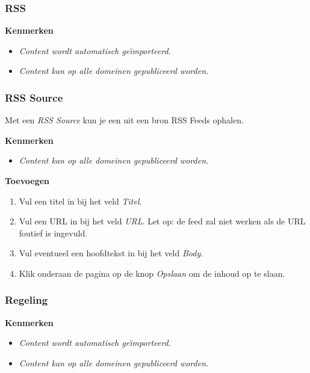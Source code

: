 \subsubsection{RSS}\label{rss}

\textbf{Kenmerken}

\begin{itemize}
\item \emph{Content wordt automatisch ge{\"\i}mporteerd.}
\item \emph{Content kan op alle domeinen gepubliceerd worden.}
\end{itemize}

\subsubsection{RSS Source}\label{rsssource}
Met een \emph{RSS Source} kun je een uit een bron RSS Feeds ophalen.

\textbf{Kenmerken}

\begin{itemize}
\item \emph{Content kan op alle domeinen gepubliceerd worden.}
\end{itemize}

\textbf{Toevoegen}

\begin{enumerate}
\item Vul een titel in bij het veld \emph{Titel}.
\item Vul een URL in bij het veld \emph{URL}. Let op: de feed zal niet werken als de URL foutief is ingevuld.
\item Vul eventueel een hoofdtekst in bij het veld \emph{Body}.
\item Klik onderaan de pagina op de knop \emph{Opslaan} om de inhoud op te slaan.
\end{enumerate}

\subsubsection{Regeling}\label{regeling}

\textbf{Kenmerken}

\begin{itemize}
\item \emph{Content wordt automatisch ge{\"\i}mporteerd.}
\item \emph{Content kan op alle domeinen gepubliceerd worden.}
\end{itemize}

